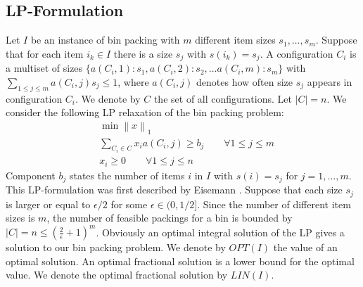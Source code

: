 \documentclass[a4paper,11pt]{article}
\newcommand{\nor}[1]{\left\|#1\right\|}
\begin{document}
\subsection{LP-Formulation}
Let $I$ be an instance of bin packing with $m$ different item sizes $s_1, \ldots, s_m$. Suppose
that for each item $i_k \in I$ there is a size $s_j$ with $s(i_k) = s_j$.
A configuration $C_i$ is a multiset of sizes $\{ a(C_i,1):s_1,  a(C_i,2):s_2, \ldots a(C_i,m):s_m \}$
with $\sum_{1\leq j\leq m} a(C_i,j)s_j \leq 1$, where $a(C_i,j)$
denotes how often size $s_j$ appears in configuration $C_i$. We denote by $C$ the set of all configurations. Let $|C|=n$.
We consider the following LP relaxation of the bin packing problem:
\begin{align*}
  &\min \nor{x}_1\\
  &\sum_{C_i \in C}x_{i} a(C_i,j) \geq b_j \qquad \forall 1 \leq j \leq m\\
  &x_{i}\geq 0 \qquad \forall 1 \leq j \leq n
\end{align*}
Component $b_j$ states the number of items $i$ in $I$ with $s(i) = s_j$ for $j = 1, \ldots , m$.
This LP-formulation was first described by Eisemann
\cite{eisemann1957trim}. Suppose that each size $s_j$ is larger or equal to
$\epsilon/2$ for some $\epsilon \in (0,1/2]$. Since the number of different item sizes is $m$,
the number of feasible packings for a bin is bounded by $|C|= n \leq
(\frac{2}{\epsilon} +1)^{m}$.
Obviously an optimal integral solution of the LP gives a solution to our bin packing problem. We denote
by $\mathit{OPT}(I)$ the value of an optimal solution. An optimal fractional solution is a lower bound 
for the optimal value. We denote the optimal fractional solution by $\mathit{LIN}(I)$.
\end{document}
